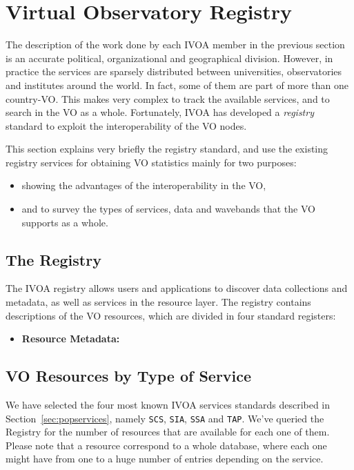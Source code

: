 \section{Virtual Observatory Registry }

The description of the work done by each IVOA member
in the previous section is an accurate political, organizational 
and geographical division. However, in practice the services
are sparsely distributed between universities, observatories
and institutes around the world. In fact, some of them 
are part of more than one country-VO. 
This makes very complex to track the available services, 
and to search in the VO as a whole. Fortunately, 
IVOA has developed a \emph{registry} standard to 
exploit the interoperability of the VO nodes.

This section explains very briefly the registry standard,
and use the existing registry services for obtaining VO 
statistics mainly for two purposes:
\begin{itemize}
\item showing the advantages of the interoperability in the VO,
\item and to survey the types of services, data and wavebands that
the VO supports as a whole.
\end{itemize}

\subsection{The Registry}

The IVOA registry allows users and applications to discover data collections and
metadata, as well as services in the resource layer. The registry contains
descriptions of the VO resources, which are divided in four standard registers:
\begin{itemize}
\item \textbf{Resource Metadata:} 
\end{itemize}

\subsection{VO Resources by Type of Service}

We have selected the four most known IVOA services standards described in Section~\ref{sec:popservices}, namely
\verb+SCS+, \verb+SIA+, \verb+SSA+ and \verb+TAP+. We've queried the Registry for the number of resources 
that are available for each one of them. Please note that a resource correspond to a whole database, where
each one might have from one to a huge number of entries depending on the service. 

